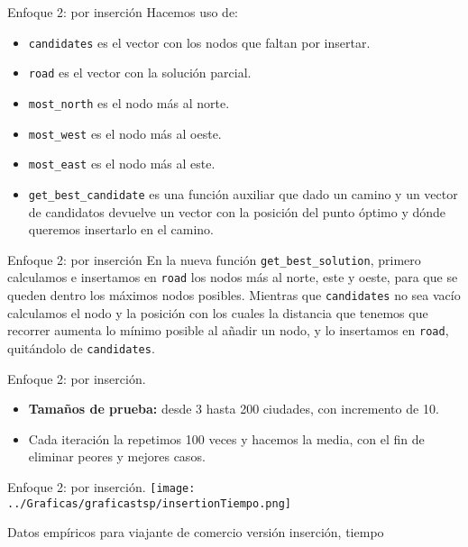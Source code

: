 \documentclass[10pt, xcolor=table]{beamer}
\begin{document}
\begin{frame}{Enfoque 2: por inserción}
Hacemos uso de:
\begin{itemize}
	\item \texttt{candidates} es el vector con los nodos que faltan por insertar. 
	\item \texttt{road} es el vector con la solución parcial. 
	\item \texttt{most\_north} es el nodo más al norte.
	\item \texttt{most\_west} es el nodo más al oeste.
	\item \texttt{most\_east} es el nodo más al este.
	\item \texttt{get\_best\_candidate} es una función auxiliar que dado un camino y un vector de candidatos devuelve un vector con la posición del punto óptimo y dónde queremos insertarlo en el camino. 
\end{itemize}
\end{frame}

\begin{frame}{Enfoque 2: por inserción}
En la nueva función \texttt{get\_best\_solution}, primero calculamos e insertamos en \texttt{road} los nodos más al norte, este y oeste, para que se queden dentro los máximos nodos posibles. Mientras que \texttt{candidates} no sea vacío calculamos el nodo y la posición con los cuales la distancia que tenemos que recorrer aumenta lo mínimo posible al añadir un nodo, y lo insertamos en \texttt{road}, quitándolo de \texttt{candidates}.
\end{frame}

\begin{frame}{Enfoque 2: por inserción. }
\begin{itemize}
	\item \textbf{Tamaños de prueba:} desde 3 hasta 200 ciudades, con incremento de 10.
	\item Cada iteración la repetimos 100 veces y hacemos la media, con el fin de eliminar peores y mejores casos.
\end{itemize}
\end{frame}

\begin{frame}[fragile]{Enfoque 2: por inserción. }
\texttt{[image: ../Graficas/graficastsp/insertionTiempo.png]}
\begin{center}
	\footnotesize{Datos empíricos para viajante de comercio versión inserción, tiempo}
\end{center}
\end{frame}
\end{document}
